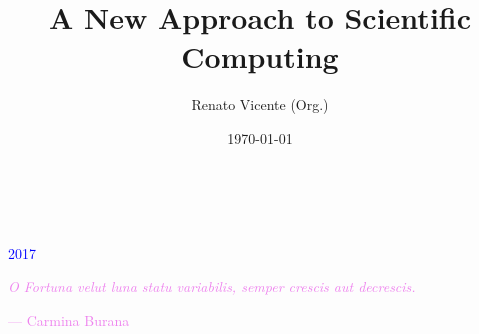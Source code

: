 \documentclass[paper=9in:6in,pagesize=pdftex,headinclude=on,footinclude=on,10pt,bibtotoc,pointlessnumbers,normalheadings,DIV=9,twoside=false]{scrbook}
\title{A New Approach to Scientific Computing}
\author{Renato Vicente (Org.)}
\date{\today}
\theoremstyle{plain}
\theoremstyle{definition}
\theoremstyle{remark}
\begin{document}
\graphicspath{{figs/}}  
\begin{titlepage}
		\\
			
		\vspace{10mm}
		\\
		\vspace{\fill}
		\centering 	\textcolor{blue}{\large{2017}}
\end{titlepage}


\newpage{}
\thispagestyle {empty}

\vspace*{2cm}

\begin{center}
	\Large{\parbox{10cm}{
		\begin{raggedright}
		{\Large 
			\textcolor{violet}{	\textit{O Fortuna velut luna statu variabilis, semper crescis
             aut decrescis.}}
		}
	
		\vspace{.5cm}\hfill{\textcolor{violet}{--- Carmina Burana}}
		\end{raggedright}
	}
}	
\end{center}

\newpage





\tableofcontents  



\end{document}
